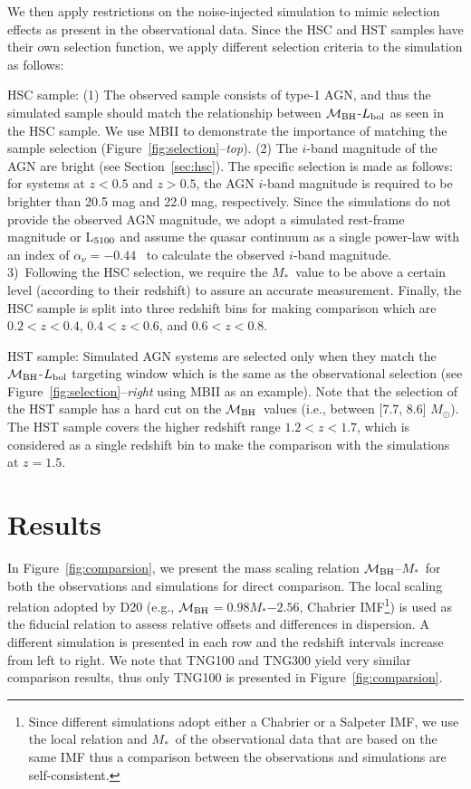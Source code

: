 \documentclass[twocolumn]{aastex631}
\def\smass{{$M_*$}}
\def\mbh{$\mathcal M_{\rm BH}$}
\begin{document}
We then apply restrictions on the noise-injected simulation to mimic selection effects as present in the observational data. Since the HSC and HST samples have their own selection function, we apply different selection criteria to the simulation as follows:

 HSC sample: (1) The observed sample consists of type-1 AGN, and thus the simulated sample should match the relationship between \mbh-$L_{\rm bol}$ as seen in the HSC sample. We use MBII to demonstrate the importance of matching the sample selection (Figure~\ref{fig:selection}--{\it top}). (2) The $i$-band magnitude of the AGN are bright (see Section~\ref{sec:hsc}). The specific selection is made as follows: for systems at $z<0.5$ and $z>0.5$, the AGN $i$-band magnitude is required to be brighter than 20.5 mag and 22.0 mag, respectively. Since the simulations do not provide the observed AGN magnitude, we adopt a simulated rest-frame magnitude or L$_{\rm 5100}$ and assume the quasar continuum as a single power-law with an index of $\alpha_\nu=-0.44$~\citep{2001AJ....122..549V} to calculate the observed $i$-band magnitude.
 3)~Following the HSC selection, we require the \smass\ value to be above a certain level (according to their redshift) to assure an accurate measurement. Finally, the HSC sample is split into three redshift bins for making comparison which are $0.2<z<0.4$, $0.4<z<0.6$, and $0.6<z<0.8$.
 
HST sample: Simulated AGN systems are selected only when they match the  \mbh-$L_{\rm bol}$ targeting window which is the same as the observational selection (see Figure~\ref{fig:selection}--{\it right} using MBII as an example). Note that the selection of the HST sample has a hard cut on the \mbh\ values (i.e., between [7.7, 8.6] $M_{\odot}$). The HST sample covers the higher redshift range $1.2<z<1.7$, which is considered as a single redshift bin to make the comparison with the simulations at $z=1.5$.


\section{Results} \label{sec:result}
In Figure~\ref{fig:comparsion}, we present the mass scaling relation \mbh--\smass\ for both the observations and simulations for direct comparison. The local scaling relation adopted by D20 (e.g., \mbh$=0.98$\smass$-2.56$, Chabrier IMF\footnote{Since different simulations adopt either a Chabrier or a Salpeter IMF, we use the local relation and \smass\ of the observational data that are based on the same IMF thus a comparison between the observations and simulations are self-consistent.}) is used as the fiducial relation to assess relative offsets and differences in dispersion. A different simulation is presented in each row and the redshift intervals increase from left to right. We note that TNG100 and TNG300 yield very similar comparison results, thus only TNG100 is presented in Figure~\ref{fig:comparsion}.
\end{document}
